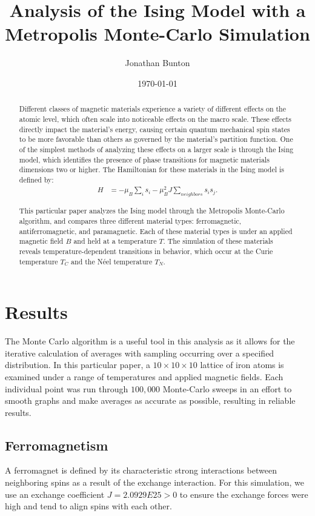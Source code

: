 \documentclass[12pt]{article}
\author{Jonathan Bunton}
\title{Analysis of the Ising Model with a\\ Metropolis Monte-Carlo Simulation}
\date{\today}
\begin{document}
\maketitle
\onehalfspacing
\begin{abstract}
Different classes of magnetic materials experience a variety of different effects on the atomic level, which often scale into noticeable effects on the macro scale.  These effects directly impact the material's energy, causing certain quantum mechanical spin states to be more favorable than others as governed by the material's partition function.  One of the simplest methods of analyzing these effects on a larger scale is through the Ising model, which identifies the presence of phase transitions for magnetic materials dimensions two or higher. \cite{isingmodel}  The Hamiltonian for these materials in the Ising model is defined by:
\begin{align}
H &= -\mu_B\sum_i s_i - \mu_B^2J\sum_{neighbors}s_i s_j.
\label{H}
\end{align}

This particular paper analyzes the Ising model through the Metropolis Monte-Carlo algorithm, and compares three different material types: ferromagnetic, antiferromagnetic, and paramagnetic.  Each of these material types is under an applied magnetic field $B$ and held at a temperature $T$.  The simulation of these materials reveals temperature-dependent transitions in behavior, which occur at the Curie temperature $T_C$ and the N\'{e}el temperature $T_N$.
\end{abstract}
\section*{Results}
The Monte Carlo algorithm is a useful tool in this analysis as it allows for the iterative calculation of averages with sampling occurring over a specified distribution. \cite{montecarlo} In this particular paper, a $10\times10\times10$ lattice of iron atoms is examined under a range of temperatures and applied magnetic fields.  Each individual point was run through $100,000$ Monte-Carlo sweeps in an effort to smooth graphs and make averages as accurate as possible, resulting in reliable results.

\subsection*{Ferromagnetism}
A ferromagnet is defined by its characteristic strong interactions between neighboring spins as a result of the exchange interaction.  For this simulation, we use an exchange coefficient $J = 2.0929E25 > 0$ to ensure the exchange forces were high and tend to align spins with each other. \cite{magnettypes, fromjesse}
\end{document}
